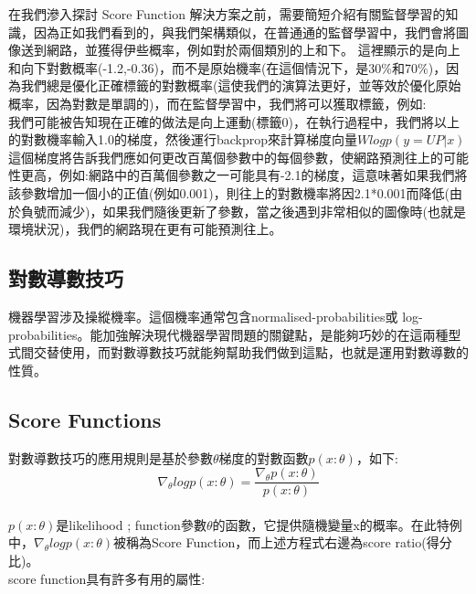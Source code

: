 \documentclass[14pt,a4paper]{report}  %
\begin{document}
\qquad 在我們滲入探討 Score Function 解決方案之前，需要簡短介紹有關監督學習的知識，因為正如我們看到的，與我們架構類似，在普通通的監督學習中，我們會將圖像送到網路，並獲得伊些概率，例如對於兩個類別的上和下。 這裡顯示的是向上和向下對數概率(-1.2,-0.36)，而不是原始機率(在這個情況下，是30$\%$和70$\%$)，因為我們總是優化正確標籤的對數概率(這使我們的演算法更好，並等效於優化原始概率，因為對數是單調的)，而在監督學習中，我們將可以獲取標籤，例如:\\

我們可能被告知現在正確的做法是向上運動(標籤0)，在執行過程中，我們將以上的對數機率輸入1.0的梯度，然後運行backprop來計算梯度向量$Wlogp(y=UP|x)$這個梯度將告訴我們應如何更改百萬個參數中的每個參數，使網路預測往上的可能性更高，例如:網路中的百萬個參數之一可能具有-2.1的梯度，這意味著如果我們將該參數增加一個小的正值(例如0.001)，則往上的對數機率將因2.1*0.001而降低(由於負號而減少)，如果我們隨後更新了參數，當之後遇到非常相似的圖像時(也就是環境狀況)，我們的網路現在更有可能預測往上。\\

\subsection{對數導數技巧}
\qquad 機器學習涉及操縱機率。這個機率通常包含normalised-probabilities或 log-probabilities。能加強解決現代機器學習問題的關鍵點，是能夠巧妙的在這兩種型式間交替使用，而對數導數技巧就能夠幫助我們做到這點，也就是運用對數導數的性質。\\
\subsection{Score Functions}
\qquad 對數導數技巧的應用規則是基於參數$\theta$梯度的對數函數$p(x:\theta)$，如下:\\
$$\nabla_\theta logp(x:\theta)=\frac{\nabla_\theta p(x:\theta)}{p(x:\theta)}$$\\
$p(x:\theta)$是likelihood ; function參數$\theta$的函數，它提供隨機變量x的概率。在此特例中，$\nabla_\theta logp(x:\theta)$被稱為Score Function，而上述方程式右邊為score ratio(得分比)。\\[6pt]


score function具有許多有用的屬性:\\
\end{document}
